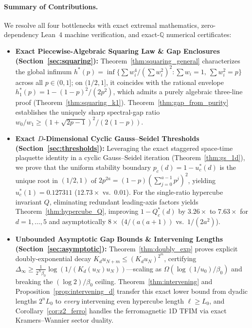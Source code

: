 \documentclass[11pt,a4paper]{article}
\theoremstyle{definition}
\newcommand{\Q}{\mathbb{Q}}
\begin{document}
\paragraph{Summary of Contributions.}
We resolve all four bottlenecks with exact extremal mathematics, zero-dependency Lean~4 machine verification, and exact-$\Q$ numerical certificates:
\begin{itemize}[leftmargin=1.6em,itemsep=2pt]
  \item \textbf{Exact Piecewise-Algebraic Squaring Law \& Gap Enclosures (Section~\ref{sec:squaring}):} Theorem~\ref{thm:squaring_general} characterizes the global infimum $h^*(p) = \inf\{\sum w_i^4 / (\sum w_i^2)^2 : \sum w_i = 1,\ \sum w_i^2 = p\}$ across all $p \in (0,1]$; on $(1/2,1]$, it coincides with the rational envelope $h_1^*(p) = 1 - (1-p)^2/(2p^2)$, which admits a purely algebraic three-line proof (Theorem~\ref{thm:squaring_k1}). Theorem~\ref{thm:gap_from_purity} establishes the uniquely sharp spectral-gap ratio $w_0/w_1 \ge (1+\sqrt{2p-1})^2/(2(1-p))$.
  \item \textbf{Exact $D$-Dimensional Cyclic Gauss--Seidel Thresholds (Section~\ref{sec:thresholds}):} Leveraging the exact staggered space-time plaquette identity in a cyclic Gauss--Seidel iteration (Theorem~\ref{thm:gs_1d}), we prove that the uniform stability boundary $p_c(d) = 1 - u_c^*(d)$ is the unique root in $(1/2,1)$ of $2p^{2a} = (1-p)(\sum_{j=0}^{a-1} p^j)^2$, yielding $u_c^*(1) = 0.127311$ ($12.73\times$ vs.\ $0.01$). For the single-ratio hypercube invariant $Q$, eliminating redundant leading-axis factors yields Theorem~\ref{thm:hypercube_Q}, improving $1 - Q_c^*(d)$ by $3.26\times$ to $7.63\times$ for $d=1,\dots,5$ and asymptotically $8\times$ ($4/(a(a+1))$ vs.\ $1/(2a^2)$).
  \item \textbf{Unbounded Asymptotic Gap Bounds \& Intervening Lengths (Section~\ref{sec:asymptotic}):} Theorem~\ref{thm:doubly_exp} proves explicit doubly-exponential decay $K_d u_{N+m} \le (K_d u_N)^{2^m}$, certifying $\Delta_\infty \ge \frac{1}{2^N \beta_0}\log(1/(K_d(u_N)u_N))$—scaling as $\Omega(\log(1/u_0)/\beta_0)$ and breaking the $(\log 2)/\beta_0$ ceiling. Theorem~\ref{thm:intervening} and Proposition~\ref{prop:intervening_d} transfer this exact lower bound from dyadic lengths $2^n L_0$ to \emph{every} intervening even hypercube length $\ell \ge L_0$, and Corollary~\ref{cor:z2_ferro} handles the ferromagnetic 1D TFIM via exact Kramers--Wannier sector duality.

\end{itemize}
\end{document}
